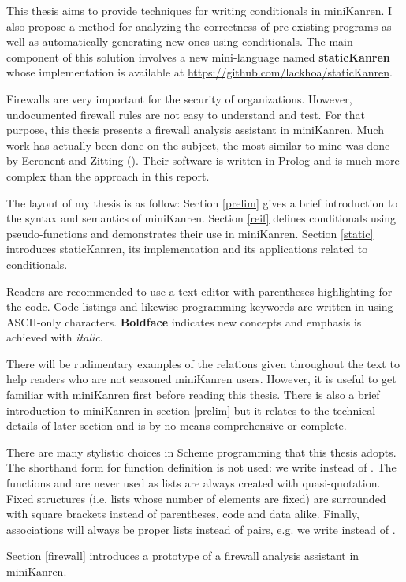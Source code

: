 \ifthesis This thesis aims to provide techniques for writing conditionals in miniKanren. I also propose a method for analyzing the correctness of pre-existing programs as well as automatically generating new ones using conditionals. The main component of this solution involves a new mini-language named \textbf{staticKanren} whose implementation is available at \url{https://github.com/lackhoa/staticKanren}.

\else Firewalls are very important for the security of organizations. However, undocumented firewall rules are not easy to understand and test. For that purpose, this thesis presents a firewall analysis assistant in miniKanren. Much work has actually been done on the subject, the most similar to mine was done by Eeronent and Zitting (\cite{Eronen2001AnES}). Their software is written in Prolog and is much more complex than the approach in this report.\fi

The layout of my thesis is as follow: Section \ref{prelim} gives a brief introduction to the syntax and semantics of miniKanren.
\ifthesis Section \ref{reif} defines conditionals using pseudo-functions and demonstrates their use in miniKanren. Section \ref{static} introduces staticKanren, its implementation and its applications related to conditionals.

Readers are recommended to use a text editor with parentheses highlighting for the code. Code listings and likewise programming keywords are written in  using ASCII-only characters. \textbf{Boldface} indicates new concepts and emphasis is achieved with \textit{italic}.

There will be rudimentary examples of the relations given throughout the text to help readers who are not seasoned miniKanren users. However, it is useful to get familiar with miniKanren first before reading this thesis. There is also a brief introduction to miniKanren in section \ref{prelim} but it relates to the technical details of later section and is by no means comprehensive or complete.

There are many stylistic choices in Scheme programming that this thesis adopts. The shorthand form for function definition is not used: we write  instead of . The functions  and  are never used as lists are always created with quasi-quotation. Fixed structures (i.e. lists whose number of elements are fixed) are surrounded with square brackets instead of parentheses, code and data alike. Finally, associations will always be proper lists instead of pairs, e.g. we write \code{([x 1] [y (a b)])} instead of \code{([x 1] [y a b])}.

\else Section \ref{firewall} introduces a prototype of a firewall analysis assistant in miniKanren.\fi